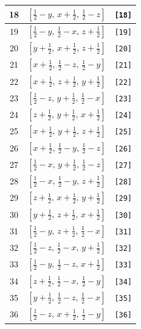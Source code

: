 \documentclass[fleqn,8pt]{jsarticle}
\begin{document}
\begin{longtable}{ccc}
18 & $\left[ \frac{1}{2} - y,\, x + \frac{1}{2},\, \frac{1}{2} - z \right]$ & {\tt [18]} \\ \hline
19 & $\left[ \frac{1}{2} - y,\, \frac{1}{2} - x,\, z + \frac{1}{2} \right]$ & {\tt [19]} \\ \hline
20 & $\left[ y + \frac{1}{2},\, x + \frac{1}{2},\, z + \frac{1}{2} \right]$ & {\tt [20]} \\ \hline
21 & $\left[ x + \frac{1}{2},\, \frac{1}{2} - z,\, \frac{1}{2} - y \right]$ & {\tt [21]} \\ \hline
22 & $\left[ x + \frac{1}{2},\, z + \frac{1}{2},\, y + \frac{1}{2} \right]$ & {\tt [22]} \\ \hline
23 & $\left[ \frac{1}{2} - z,\, y + \frac{1}{2},\, \frac{1}{2} - x \right]$ & {\tt [23]} \\ \hline
24 & $\left[ z + \frac{1}{2},\, y + \frac{1}{2},\, x + \frac{1}{2} \right]$ & {\tt [24]} \\ \hline
25 & $\left[ x + \frac{1}{2},\, y + \frac{1}{2},\, z + \frac{1}{2} \right]$ & {\tt [25]} \\ \hline
26 & $\left[ x + \frac{1}{2},\, \frac{1}{2} - y,\, \frac{1}{2} - z \right]$ & {\tt [26]} \\ \hline
27 & $\left[ \frac{1}{2} - x,\, y + \frac{1}{2},\, \frac{1}{2} - z \right]$ & {\tt [27]} \\ \hline
28 & $\left[ \frac{1}{2} - x,\, \frac{1}{2} - y,\, z + \frac{1}{2} \right]$ & {\tt [28]} \\ \hline
29 & $\left[ z + \frac{1}{2},\, x + \frac{1}{2},\, y + \frac{1}{2} \right]$ & {\tt [29]} \\ \hline
30 & $\left[ y + \frac{1}{2},\, z + \frac{1}{2},\, x + \frac{1}{2} \right]$ & {\tt [30]} \\ \hline
31 & $\left[ \frac{1}{2} - y,\, z + \frac{1}{2},\, \frac{1}{2} - x \right]$ & {\tt [31]} \\ \hline
32 & $\left[ \frac{1}{2} - z,\, \frac{1}{2} - x,\, y + \frac{1}{2} \right]$ & {\tt [32]} \\ \hline
33 & $\left[ \frac{1}{2} - y,\, \frac{1}{2} - z,\, x + \frac{1}{2} \right]$ & {\tt [33]} \\ \hline
34 & $\left[ z + \frac{1}{2},\, \frac{1}{2} - x,\, \frac{1}{2} - y \right]$ & {\tt [34]} \\ \hline
35 & $\left[ y + \frac{1}{2},\, \frac{1}{2} - z,\, \frac{1}{2} - x \right]$ & {\tt [35]} \\ \hline
36 & $\left[ \frac{1}{2} - z,\, x + \frac{1}{2},\, \frac{1}{2} - y \right]$ & {\tt [36]} \\ \hline

\end{longtable}
\end{document}
